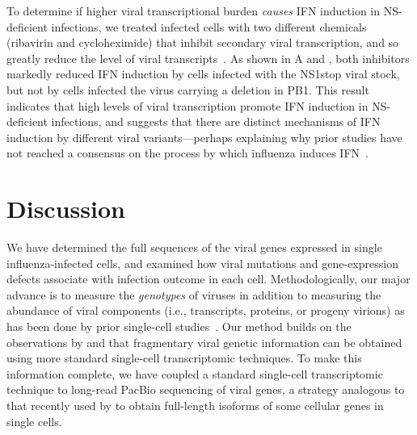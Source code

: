 \documentclass[9pt,lineno]{elife}
\begin{document}
To determine if higher viral transcriptional burden \emph{causes} IFN induction in NS-deficient infections, we treated infected cells with two different chemicals (ribavirin and cycloheximide) that inhibit secondary viral transcription, and so greatly reduce the level of viral transcripts~\citep{Vanderlinden:2016ec,Reuther:2015ef,Scholtissek:1976wg, killip2014activation}.
As shown in A and , both inhibitors markedly reduced IFN induction by cells infected with the NS1stop viral stock, but not by cells infected the virus carrying a deletion in PB1.
This result indicates that high levels of viral transcription promote IFN induction in NS-deficient infections, and suggests that there are distinct mechanisms of IFN induction by different viral variants---perhaps explaining why prior studies have not reached a consensus on the process by which influenza induces IFN~\citep{rehwinkel2010rig, weber2013incoming, killip2014activation}.

\section{Discussion}
We have determined the full sequences of the viral genes expressed in single influenza-infected cells, and examined how viral mutations and gene-expression defects associate with infection outcome in each cell.
Methodologically, our major advance is to measure the \emph{genotypes} of viruses in addition to measuring the abundance of viral components (i.e., transcripts, proteins, or progeny virions) as has been done by prior single-cell studies~\citep{russell2018extreme, zanini2018single, zanini2018virus, steuerman2018dissection, saikia2018simultaneous, zhu2009growth, schulte2014single, akpinar2016high, heldt2015single, brooke2013most}.
Our method builds on the observations by \citet{saikia2018simultaneous} and \citet{zanini2018virus} that fragmentary viral genetic information can be obtained using more standard single-cell transcriptomic techniques.
To make this information complete, we have coupled a standard single-cell transcriptomic technique to long-read PacBio sequencing of viral genes, a strategy analogous to that recently used by \cite{gupta2018single} to obtain full-length isoforms of some cellular genes in single cells.
\end{document}
